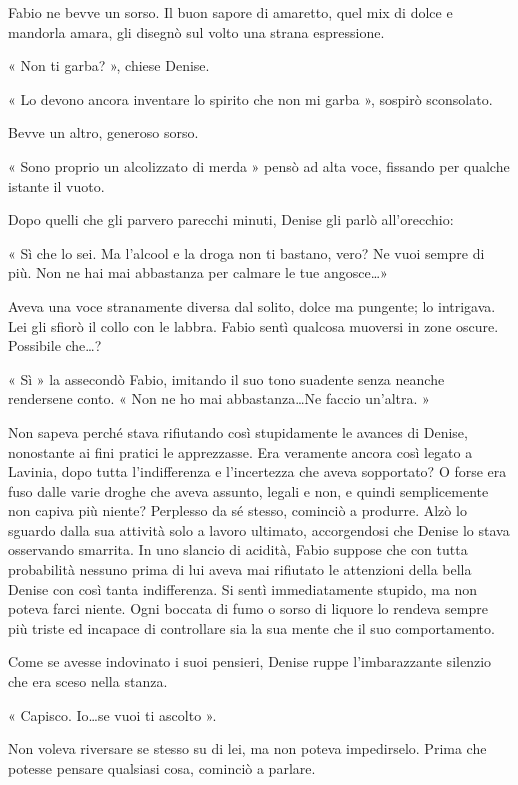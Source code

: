Fabio ne bevve un sorso. Il buon sapore di amaretto, quel mix di dolce e mandorla amara, gli disegnò sul volto una strana espressione.

« Non ti garba? », chiese Denise.

« Lo devono ancora inventare lo spirito che non mi garba », sospirò sconsolato.

Bevve un altro, generoso sorso.

« Sono proprio un alcolizzato di merda » pensò ad alta voce, fissando per qualche istante il vuoto.

Dopo quelli che gli parvero parecchi minuti, Denise gli parlò all'orecchio:

« Sì che lo sei. Ma l'alcool e la droga non ti bastano, vero? Ne vuoi sempre di più. Non ne hai mai abbastanza per calmare le tue angosce\ldots »

Aveva una voce stranamente diversa dal solito, dolce ma pungente; lo intrigava. Lei gli sfiorò il collo con le labbra. Fabio sentì qualcosa muoversi in zone oscure. Possibile che\ldots?

« Sì » la assecondò Fabio, imitando il suo tono suadente senza neanche rendersene conto. « Non ne ho mai abbastanza\ldots Ne faccio un'altra. »

Non sapeva perché stava rifiutando così stupidamente le avances di Denise, nonostante ai fini pratici le apprezzasse. Era veramente ancora così legato a Lavinia, dopo tutta l'indifferenza e l'incertezza che aveva sopportato? O forse era fuso dalle varie droghe che aveva assunto, legali e non, e quindi semplicemente non capiva più niente? Perplesso da sé stesso, cominciò a produrre. Alzò lo sguardo dalla sua attività solo a lavoro ultimato, accorgendosi che Denise lo stava osservando smarrita. In uno slancio di acidità, Fabio suppose che con tutta probabilità nessuno prima di lui aveva mai rifiutato le attenzioni della bella Denise con così tanta indifferenza. Si sentì immediatamente stupido, ma non poteva farci niente. Ogni boccata di fumo o sorso di liquore lo rendeva sempre più triste ed incapace di controllare sia la sua mente che il suo comportamento.

Come se avesse indovinato i suoi pensieri, Denise ruppe l'imbarazzante silenzio che era sceso nella stanza.

« Capisco. Io\ldots se vuoi ti ascolto ».

Non voleva riversare se stesso su di lei, ma non poteva impedirselo. Prima che potesse pensare qualsiasi cosa, cominciò a parlare.

